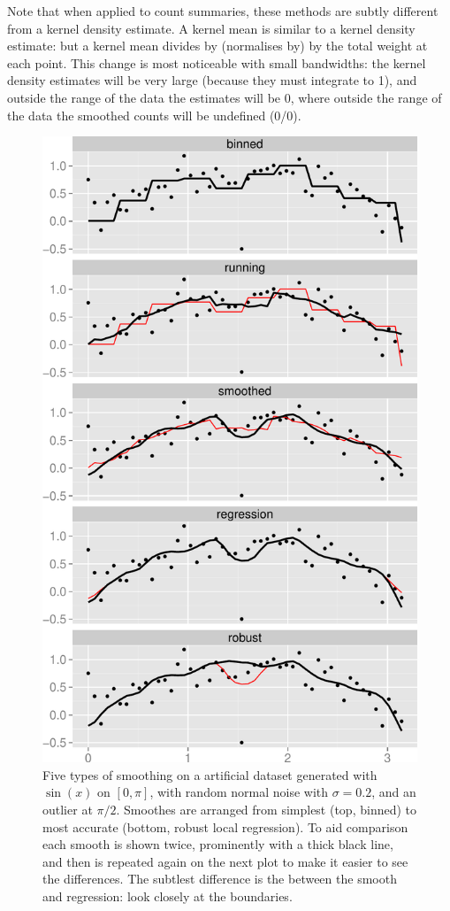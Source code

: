 \documentclass[journal]{vgtc}                %
\begin{document}
Note that when applied to count summaries, these methods are subtly different from a kernel density estimate. A kernel mean is similar to a kernel density estimate: but a kernel mean divides by (normalises by) by the total weight at each point. This change is most noticeable with small bandwidths: the kernel density estimates will be very large (because they must integrate to 1), and outside the range of the data the estimates will be 0, where outside the range of the data the smoothed counts will be undefined (0/0).

\begin{figure}[htb]
 \centering
 \includegraphics[width=0.75\linewidth]{smooth-types}
 \caption{Five types of smoothing on a artificial dataset generated with $\sin(x)$ on $[0, \pi]$, with random normal noise with $\sigma = 0.2$, and an outlier at $\pi / 2$. Smoothes are arranged from simplest (top, binned) to most accurate (bottom, robust local regression). To aid comparison each smooth is shown twice, prominently with a thick black line, and then is repeated again on the next plot to make it easier to see the differences.  The subtlest difference is the between the smooth and regression: look closely at the boundaries.}
 \label{fig:smooth-types}
\end{figure}
\end{document}
